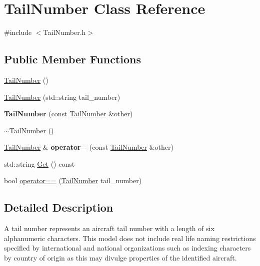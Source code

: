 \hypertarget{class_tail_number}{}\section{Tail\+Number Class Reference}
\label{class_tail_number}


{\ttfamily \#include $<$Tail\+Number.\+h$>$}

\subsection*{Public Member Functions}
\begin{DoxyCompactItemize}
\item 
\hyperlink{class_tail_number_aedfed97e186c7692a736e6f0ec1a2675}{Tail\+Number} ()
\item 
\hyperlink{class_tail_number_a5ff2cb0cd0a307ab278e541a7e8bf27b}{Tail\+Number} (std\+::string tail\+\_\+number)
\item 
\hypertarget{class_tail_number_a8f616b8492a7c3ad27e2bf4c8b0ac1d8}{}{\bfseries Tail\+Number} (const \hyperlink{class_tail_number}{Tail\+Number} \&other)\label{class_tail_number_a8f616b8492a7c3ad27e2bf4c8b0ac1d8}

\item 
\hyperlink{class_tail_number_a1ac1a2e34776196095cff27086dcda59}{$\sim$\+Tail\+Number} ()
\item 
\hypertarget{class_tail_number_a405874bdd284ff56d167d8866072267d}{}\hyperlink{class_tail_number}{Tail\+Number} \& {\bfseries operator=} (const \hyperlink{class_tail_number}{Tail\+Number} \&other)\label{class_tail_number_a405874bdd284ff56d167d8866072267d}

\item 
std\+::string \hyperlink{class_tail_number_a3d0e0fea667ef172fbc3aaa843c701ab}{Get} () const 
\item 
bool \hyperlink{class_tail_number_a83f6ce7e20387e68c84716088ff4fec4}{operator==} (\hyperlink{class_tail_number}{Tail\+Number} tail\+\_\+number)
\end{DoxyCompactItemize}


\subsection{Detailed Description}
A tail number represents an aircraft tail number with a length of six alphanumeric characters. This model does not include real life naming restrictions specified by international and national organizations such as indexing characters by country of origin as this may divulge properties of the identified aircraft. 

